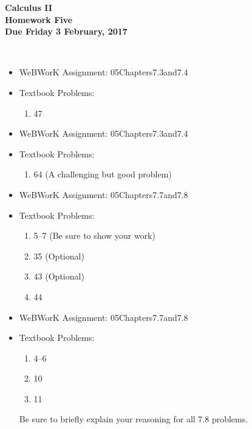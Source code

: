 \documentclass[12pt]{article}
\begin{document}
\pagestyle{empty}
 
\begin{center}
{\large {\bf Calculus II}}\\
\medskip
{\large {\bf Homework Five}}\\
\medskip
{ {\bf Due Friday 3 February, 2017}}\\
\end{center}

 \\ 


\begin{itemize}
\setlength{\itemsep}{0mm}
\item WeBWorK Assignment: 05Chapters7.3and7.4
\item Textbook Problems:
  \begin{enumerate}
  \setlength{\itemsep}{-1mm}
    \item 47
  \end{enumerate}
\end{itemize}

\begin{itemize}
\setlength{\itemsep}{0mm}
\item WeBWorK Assignment: 05Chapters7.3and7.4
\item Textbook Problems:
  \begin{enumerate}
  \setlength{\itemsep}{-1mm}
    \item 64 (A challenging but good problem)
  \end{enumerate}
\end{itemize}


\begin{itemize}
\setlength{\itemsep}{0mm}
\item WeBWorK Assignment: 05Chapters7.7and7.8
\item Textbook Problems:
  \begin{enumerate}
  \setlength{\itemsep}{-1mm}
    \item 5--7 (Be sure to show your work)
    \item 35 (Optional)
    \item 43 (Optional)
    \item 44
  \end{enumerate}
\end{itemize}


\begin{itemize}
\setlength{\itemsep}{0mm}
\item WeBWorK Assignment: 05Chapters7.7and7.8
\item Textbook Problems:
  \begin{enumerate}
  \setlength{\itemsep}{-1mm}
    \item 4--6
    \item 10 
    \item 11
  \end{enumerate}
  Be sure to briefly explain your reasoning for all 7.8 problems. 
\end{itemize}
\end{document}
